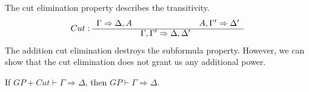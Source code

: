 The cut elimination property describes the transitivity.
\begin{equation}
    Cut: \begin{array}{c c c}
        \Gamma \Rightarrow \Delta,A & & A,\Gamma'  \Rightarrow \Delta'\\\cline{1-3}
        &  \Gamma, \Gamma'  \Rightarrow \Delta,\Delta' &
    \end{array}
\end{equation}
The addition cut elimination destroys the subformula property. However, we can show that the cut elimination does not grant us any additional power.

\begin{theorem}
    If \(GP + Cut\vdash \Gamma \Rightarrow \Delta \), then \(GP \vdash \Gamma \Rightarrow \Delta\).
\end{theorem}

